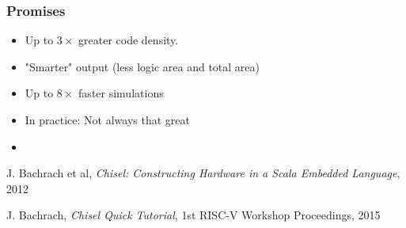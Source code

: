 \documentclass{beamer}
\begin{document}
\begin{frame}
\frametitle{Promises}
\begin{itemize}
\item Up to $3\times$ greater code density.

\item "Smarter" output (less logic area and total area)

\item Up to $8\times$ faster simulations

\item In practice: Not always that great
\end{itemize}
\end{frame}

\begin{frame}
\begin{itemize}

\item 




\end{itemize}
\end{frame}

\begin{thebibliography}{9}

	J. Bachrach et al,
	\emph{Chisel: Constructing Hardware in a Scala Embedded Language},
	2012

	J. Bachrach,
	\emph{Chisel Quick Tutorial},
	1st RISC-V Workshop Proceedings,
	2015

\end{thebibliography}
\end{document}
